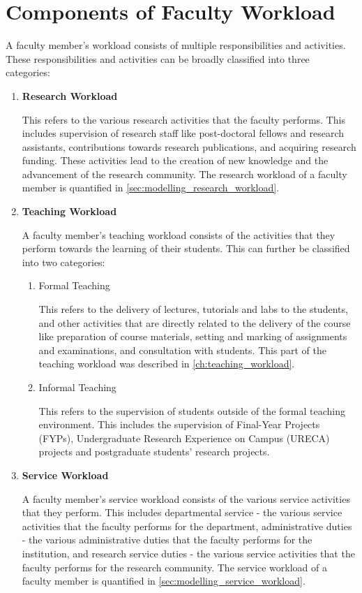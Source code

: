 \section{Components of Faculty Workload}

A faculty member's workload consists of multiple responsibilities and activities. These responsibilities and activities can be broadly classified into three categories:

\begin{enumerate}
  \item \textbf{Research Workload}

        This refers to the various research activities that the faculty performs. This includes supervision of research staff like post-doctoral fellows and research assistants, contributions towards research publications, and acquiring research funding. These activities lead to the creation of new knowledge and the advancement of the research community. The research workload of a faculty member is quantified in \autoref{sec:modelling_research_workload}.

  \item \textbf{Teaching Workload}

        A faculty member's teaching workload consists of the activities that they perform towards the learning of their students. This can further be classified into two categories:

        \begin{enumerate}
          \item Formal Teaching

                This refers to the delivery of lectures, tutorials and labs to the students, and other activities that are directly related to the delivery of the course like preparation of course materials, setting and marking of assignments and examinations, and consultation with students. This part of the teaching workload was described in \autoref{ch:teaching_workload}.

          \item Informal Teaching

                This refers to the supervision of students outside of the formal teaching environment. This includes the supervision of Final-Year Projects (FYPs), Undergraduate Research Experience on Campus (URECA) projects and postgraduate students' research projects.

        \end{enumerate}

  \item \textbf{Service Workload}

        A faculty member's service workload consists of the various service activities that they perform. This includes departmental service - the various service activities that the faculty performs for the department, administrative duties - the various administrative duties that the faculty performs for the institution, and research service duties - the various service activities that the faculty performs for the research community. The service workload of a faculty member is quantified in \autoref{sec:modelling_service_workload}.

\end{enumerate}

